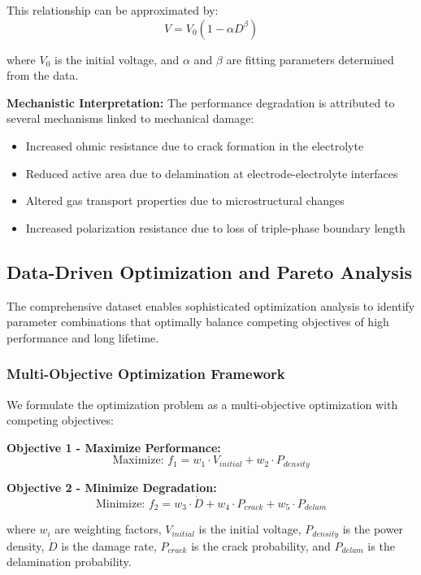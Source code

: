 \documentclass[conference]{IEEEtran}
\begin{document}
This relationship can be approximated by:
\begin{equation}
V = V_0(1 - \alpha D^{\beta})
\end{equation}

where $V_0$ is the initial voltage, and $\alpha$ and $\beta$ are fitting parameters determined from the data.

\textbf{Mechanistic Interpretation:}
The performance degradation is attributed to several mechanisms linked to mechanical damage:
\begin{itemize}
\item Increased ohmic resistance due to crack formation in the electrolyte
\item Reduced active area due to delamination at electrode-electrolyte interfaces
\item Altered gas transport properties due to microstructural changes
\item Increased polarization resistance due to loss of triple-phase boundary length
\end{itemize}

\subsection{Data-Driven Optimization and Pareto Analysis}

The comprehensive dataset enables sophisticated optimization analysis to identify parameter combinations that optimally balance competing objectives of high performance and long lifetime.

\subsubsection{Multi-Objective Optimization Framework}

We formulate the optimization problem as a multi-objective optimization with competing objectives:

\textbf{Objective 1 - Maximize Performance:}
\begin{equation}
\text{Maximize: } f_1 = w_1 \cdot V_{initial} + w_2 \cdot P_{density}
\end{equation}

\textbf{Objective 2 - Minimize Degradation:}
\begin{equation}
\text{Minimize: } f_2 = w_3 \cdot \dot{D} + w_4 \cdot P_{crack} + w_5 \cdot P_{delam}
\end{equation}

where $w_i$ are weighting factors, $V_{initial}$ is the initial voltage, $P_{density}$ is the power density, $\dot{D}$ is the damage rate, $P_{crack}$ is the crack probability, and $P_{delam}$ is the delamination probability.
\end{document}

